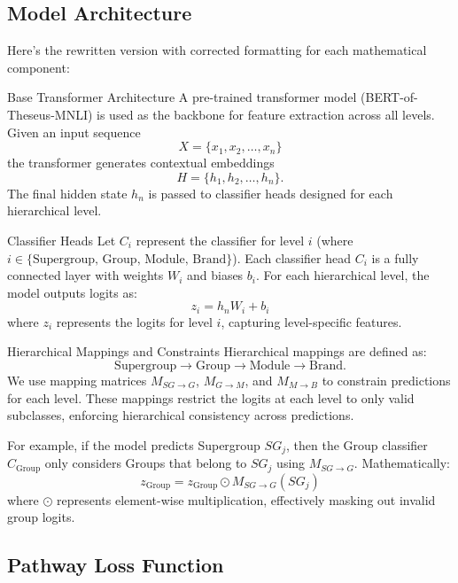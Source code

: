 \documentclass[9pt,a4paper,twoside]{rho-class/rho}
\begin{document}
  \subsection{Model Architecture}
    
        Here’s the rewritten version with corrected formatting for each mathematical component:

        Base Transformer Architecture  
        A pre-trained transformer model (BERT-of-Theseus-MNLI) is used as the backbone for feature extraction across all levels. Given an input sequence 
        \[
        X = \{x_1, x_2, \ldots, x_n\}
        \]
        the transformer generates contextual embeddings 
        \[
        H = \{h_1, h_2, \ldots, h_n\}.
        \]
        The final hidden state \( h_n \) is passed to classifier heads designed for each hierarchical level.
        
        Classifier Heads  
        Let \( C_i \) represent the classifier for level \( i \) (where \( i \in \{\text{Supergroup, Group, Module, Brand}\} \)). Each classifier head \( C_i \) is a fully connected layer with weights \( W_i \) and biases \( b_i \). For each hierarchical level, the model outputs logits as:
        \[
        z_i = h_n W_i + b_i
        \]
        where \( z_i \) represents the logits for level \( i \), capturing level-specific features.
        
        Hierarchical Mappings and Constraints  
        Hierarchical mappings are defined as:
        \[
        \text{Supergroup} \rightarrow \text{Group} \rightarrow \text{Module} \rightarrow \text{Brand}.
        \]
        We use mapping matrices \( M_{SG \rightarrow G} \), \( M_{G \rightarrow M} \), and \( M_{M \rightarrow B} \) to constrain predictions for each level. These mappings restrict the logits at each level to only valid subclasses, enforcing hierarchical consistency across predictions.
        
        For example, if the model predicts Supergroup \( SG_j \), then the Group classifier \( C_{\text{Group}} \) only considers Groups that belong to \( SG_j \) using \( M_{SG \rightarrow G} \). Mathematically:
        \[
        z_{\text{Group}} = z_{\text{Group}} \odot M_{SG \rightarrow G}(SG_j)
        \]
        where \( \odot \) represents element-wise multiplication, effectively masking out invalid group logits.

  \subsection{Pathway Loss Function}
    
\end{document}
